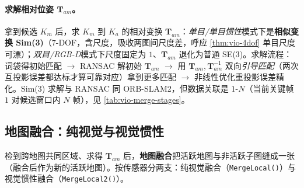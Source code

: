 \paragraph{求解相对位姿 $\mathbf{T}_{am}$。}
拿到候选 $K_m$ 后，求 $K_m$ 到 $K_a$ 的相对变换 $\mathbf{T}_{am}$：\emph{单目/单目惯性}模式下是\textbf{相似变换 Sim(3)}（$7$-DOF，含尺度，吸收两图间尺度差，呼应 \cref{thm:vio-4dof} 单目尺度可漂）；\emph{双目/RGB-D}模式下尺度固定为 $1$、$\mathbf{T}_{am}$ 退化为普通 SE(3)。求解流程：词袋得初始匹配 $\to$ RANSAC 解初始 $\mathbf{T}_{am}$ $\to$ 用 $\mathbf{T}_{am},\mathbf{T}_{am}^{-1}$ 双向\emph{引导匹配}（两次互投影误差都达标才算可靠对应）拿到更多匹配 $\to$ 非线性优化重投影误差精化。Sim(3) 求解与 RANSAC 同 ORB-SLAM2，但数据关联是 $1$-$N$（当前关键帧 $1$ 对候选窗口内 $N$ 帧），见 \cref{tab:vio-merge-stages}。

\subsection{地图融合：纯视觉与视觉惯性}
\label{sec:vio-merge}

检到跨地图共同区域、求得 $\mathbf{T}_{am}$ 后，\textbf{地图融合}把活跃地图与非活跃子图缝成一张（融合后作为新的活跃地图）。按传感器分两支：纯视觉融合（\texttt{MergeLocal()}）与视觉惯性融合（\texttt{MergeLocal2()}）。

